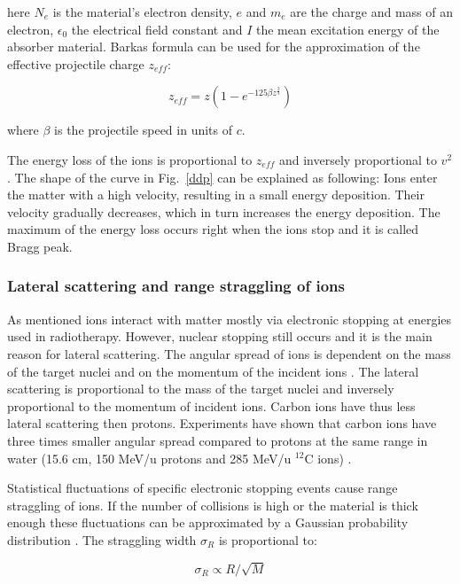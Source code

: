 \documentclass[type=dr, dr=rernat, accentcolor=tud7b,colorbacktitle, bigchapter, openright, twoside, 12pt ]{tudthesis}
\begin{document}
here $N_{e}$ is the material's electron density, $e$ and $m_{e}$ are the charge and mass 
of an electron, $\epsilon_{0}$ the electrical field constant and $I$ the mean excitation energy of the absorber material. 
Barkas formula \cite{Barkas1963} can be used for the approximation of the effective projectile charge $z_{eff}$: 

\begin{equation}
 z_{eff} = z \left( 1 - e^{-125 \beta z^{\frac{2}{3}}} \right)
\end{equation}

where $\beta$ is the projectile speed in units of $c$.

The energy loss of the ions is proportional to $z_{eff}$ and inversely proportional to $v^2$. The shape of the curve in Fig.~\ref{ddp} can be explained as following: Ions enter the matter with a high velocity, resulting in a small energy deposition. Their velocity gradually decreases, which in turn increases the energy deposition. The maximum of the energy loss occurs right when the ions stop and it is called Bragg peak.

\subsubsection{Lateral scattering and range straggling of ions}
\label{scat}
As mentioned ions interact with matter mostly via electronic stopping at energies used in radiotherapy. However, nuclear stopping still occurs and it is the main reason for lateral scattering.
The angular spread of ions is dependent on the mass of the target nuclei and on the momentum of the incident ions \cite{Moliere1948}. The lateral scattering is proportional to the mass of the target nuclei and inversely proportional
to the momentum of incident ions. Carbon ions have thus less lateral scattering then protons. Experiments have shown that carbon ions have three times smaller angular spread compared to protons at the same range in water 
(15.6 cm, 150 MeV/u protons and 285 MeV/u $^{12}$C ions) \cite{Schardt2010}.

Statistical fluctuations of specific electronic stopping events cause range straggling of ions. If the number of collisions is high or the material is thick enough these fluctuations can be approximated by
a Gaussian probability distribution \cite{Bohr1940, Ahlen1980}. The straggling width $\sigma_R$ is proportional to:

\begin{equation}
 \sigma_R \propto R/\sqrt{M}
\end{equation}
\end{document}
